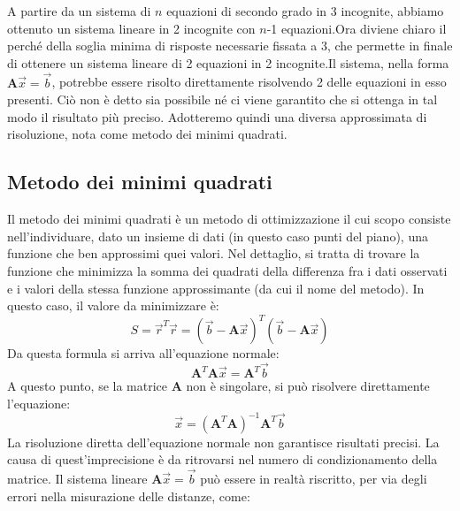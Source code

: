 \documentclass[Lau,binding=0.6cm]{sapthesis}
\begin{document}
A partire da un sistema di $n$ equazioni di secondo grado in 3 incognite, abbiamo ottenuto un sistema lineare in 2 incognite con $n$-1 equazioni.\newline Ora diviene chiaro il perché della soglia minima di risposte necessarie fissata a 3, che permette in finale di ottenere un sistema lineare di 2 equazioni in 2 incognite.\newline Il sistema, nella forma $\textbf{A}\overrightarrow{x}=\overrightarrow{b}$, potrebbe essere risolto direttamente risolvendo 2 delle equazioni in esso presenti. Ciò non è detto sia possibile né ci viene garantito che si ottenga in tal modo il risultato più preciso. Adotteremo quindi una diversa approssimata di risoluzione, nota come metodo dei minimi quadrati.\newline

\subsection{Metodo dei minimi quadrati}
Il metodo dei minimi quadrati è un metodo di ottimizzazione il cui scopo consiste nell'individuare, dato un insieme di dati (in questo caso punti del piano), una funzione che ben approssimi quei valori. Nel dettaglio, si tratta di trovare la funzione che minimizza la somma dei quadrati della differenza fra i dati osservati e i valori della  stessa funzione approssimante (da cui il nome del metodo).\newline
In questo caso, il valore da minimizzare è: \newline
\begin{equation}
S = \overrightarrow{r}^T\overrightarrow{r} = (\overrightarrow{b}-\textbf{A}\overrightarrow{x})^T(\overrightarrow{b}-\textbf{A}\overrightarrow{x})
\end{equation}
\newline
Da questa formula si arriva all'equazione normale:\newline
\begin{equation}
\textbf{A}^T\textbf{A}\overrightarrow{x} = \textbf{A}^T\overrightarrow{b}
\end{equation}
\newline
A questo punto, se la matrice $\textbf{A}$ non è singolare, si può risolvere direttamente l'equazione:\newline
\[\overrightarrow{x} = (\textbf{A}^T\textbf{A})^{-1}\textbf{A}^T\overrightarrow{b}\]
La risoluzione diretta dell'equazione normale non garantisce risultati precisi. La causa di quest'imprecisione è da ritrovarsi nel numero di condizionamento della matrice. Il sistema lineare $\textbf{A}\overrightarrow{x} = \overrightarrow{b}$ può essere in realtà riscritto, per via degli errori nella misurazione delle distanze, come: \newline
\end{document}
